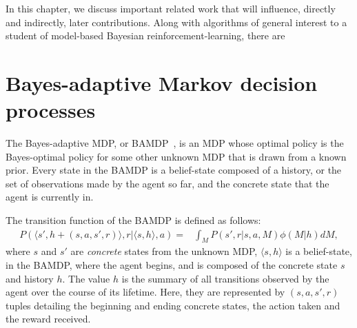 
In this chapter, we discuss important related work that will influence, directly and indirectly, later contributions.  Along with algorithms of general interest to a student of model-based Bayesian reinforcement-learning, there are

\section{Bayes-adaptive Markov decision processes}


The Bayes-adaptive MDP, or BAMDP~\cite{duff03}, is an MDP whose optimal policy is the Bayes-optimal policy for some other unknown MDP that is drawn from a known prior. Every state in the BAMDP is a belief-state composed of a history, or the set of observations made by the agent so far, and the concrete state that the agent is currently in.

The transition function of the BAMDP is defined as follows:
\begin{eqnarray}
\label{rel:bamdp:prob}
P(\langle s', h + (s,a,s',r)\rangle, r | \langle s, h\rangle, a) =& \int_M P(s', r | s, a, M)\phi(M|h) dM,
\end{eqnarray}
where $s$ and $s'$ are \emph{concrete} states from the unknown MDP, $\langle s, h\rangle$ is a belief-state, in the BAMDP, where the agent begins, and is composed of the concrete state $s$ and history $h$. The value $h$ is the summary of all transitions observed by the agent over the course of its lifetime. Here, they are represented by $(s, a, s',r)$ tuples detailing the beginning and ending concrete states, the action taken and the reward received.


